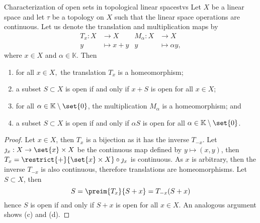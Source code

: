 \begin{proposition}{Characterization of open sets in topological linear spaces}{tvs}
    Let \(X\) be a linear space and let \(\tau\) be a topology on \(X\) such that the linear space operations are continuous. Let us denote the translation and multiplication maps by
    \begin{align*}
        T_x : X &\to X&
        M_\alpha : X &\to X\\
        y &\mapsto x + y&
              y &\mapsto \alpha y,
    \end{align*}
    where \(x \in X\) and \(\alpha \in \mathbb{K}\). Then
    \begin{enumerate}[label=(\alph*)]
        \item for all \(x \in X,\) the translation \(T_x\) is a homeomorphism;
        \item a subset \(S \subset X\) is open if and only if \(x + S\) is open for all \(x \in X\);
        \item for all \(\alpha \in \mathbb{K}\setminus\set{0}\), the multiplication \(M_\alpha\) is a homeomorphism; and
        \item a subset \(S \subset X\) is open if and only if \(\alpha S\) is open for all \(\alpha \in \mathbb{K} \setminus\set{0}\).
    \end{enumerate}
\end{proposition}
\begin{proof}
    Let \(x \in X\), then \(T_x\) is a bijection as it has the inverse \(T_{-x}\). Let \(\jmath_{x} : X \to \set{x} \times X\) be the continuous map defined by \(y \mapsto (x,y)\), then \(T_x = \restrict{+}{\set{x}\times X} \circ \jmath_{x}\) is continuous. As \(x\) is arbitrary, then the inverse \(T_{-x}\) is also continuous, therefore translations are homeomorphisms. Let \(S \subset X\), then
    \begin{equation*}
        S = \preim{T_{x}}{S + x} = T_{-x}(S + x)
    \end{equation*}
    hence \(S\) is open if and only if \(S + x\) is open for all \(x \in X\). An analogous argument shows (c) and (d).
\end{proof}


